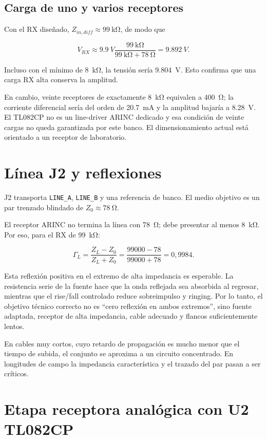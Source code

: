 \documentclass[11pt,a4paper]{article}
\newcommand{\component}[1]{\texttt{#1}}
\begin{document}
\subsection{Carga de uno y varios receptores}

Con el RX diseñado, $Z_{in,diff}\approx\SI{99}{\kilo\ohm}$, de modo que

\[
 V_{RX}\approx\SI{9.9}{V}
 \frac{\SI{99}{\kilo\ohm}}{\SI{99}{\kilo\ohm}+\SI{78}{\ohm}}
 =\SI{9.892}{V}.
\]

Incluso con el mínimo de \SI{8}{\kilo\ohm}, la tensión sería
\SI{9.804}{V}. Esto confirma que una carga RX alta conserva la amplitud.

En cambio, veinte receptores de exactamente \SI{8}{\kilo\ohm} equivalen a
\SI{400}{\ohm}; la corriente diferencial sería del orden de
\SI{20.7}{\milli\ampere} y la amplitud bajaría a \SI{8.28}{V}. El TL082CP no
es un line-driver ARINC dedicado y esa condición de veinte cargas no queda
garantizada por este banco. El dimensionamiento actual está orientado a un
receptor de laboratorio.

\section{Línea J2 y reflexiones}

J2 transporta \component{LINE\_A}, \component{LINE\_B} y una referencia de
banco. El medio objetivo es un par trenzado blindado de
$Z_0\approx\SI{78}{\ohm}$.

El receptor ARINC no termina la línea con \SI{78}{\ohm}; debe presentar al
menos \SI{8}{\kilo\ohm}. Por eso, para el RX de \SI{99}{\kilo\ohm}:

\[
 \Gamma_L=\frac{Z_L-Z_0}{Z_L+Z_0}
 =\frac{99000-78}{99000+78}=0{,}9984.
\]

Esta reflexión positiva en el extremo de alta impedancia es esperable. La
resistencia serie de la fuente hace que la onda reflejada sea absorbida al
regresar, mientras que el rise/fall controlado reduce sobreimpulso y ringing.
Por lo tanto, el objetivo técnico correcto no es ``cero reflexión en ambos
extremos'', sino fuente adaptada, receptor de alta impedancia, cable adecuado y
flancos suficientemente lentos.

En cables muy cortos, cuyo retardo de propagación es mucho menor que el tiempo
de subida, el conjunto se aproxima a un circuito concentrado. En longitudes de
campo la impedancia característica y el trazado del par pasan a ser críticos.

\section{Etapa receptora analógica con U2 TL082CP}
\end{document}
